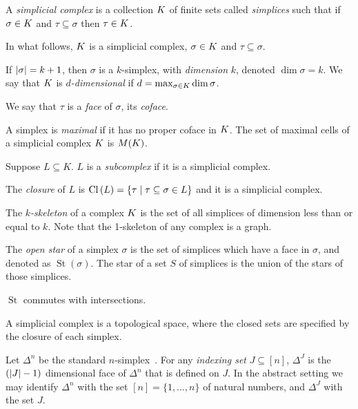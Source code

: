 \begin{definition}
A \emph{simplicial complex} is a collection $K$ of finite sets called
\emph{simplices} such that if $\sigma \in K$ and $\tau \subseteq \sigma$ then $\tau \in K$. 
\end{definition}
In what follows, $K$ is a simplicial complex, $\sigma \in K$ and $\tau \subseteq \sigma$.
\begin{definition}[Dimension]
If $|\sigma| = k+1$, then $\sigma$ is a $k$-simplex, with \emph{dimension} $k$, denoted 
$\dim{\sigma} = k$. We say that $K$ is \emph{$d$-dimensional} if 
$d = \max_{\sigma \in K} \dim{\sigma}$.
\end{definition}
\begin{definition}
We say that $\tau$ is a \emph{face} of $\sigma$, its \emph{coface}. 
\end{definition}
\begin{definition}
A simplex is \emph{maximal} if it has no proper coface in $K$. The set of maximal cells of a simplicial complex $K$ is $M(K)$. 
\end{definition}
\begin{definition}[Subcomplexes]
Suppose $L \subseteq K$.  $L$ is a \emph{subcomplex} if it is a simplicial complex.
\end{definition}
\begin{definition}[Closure]
 The \emph{closure} of $L$ is $\operatorname{Cl}{(}L) = \{ \tau \mid \tau \subseteq \sigma \in L\}$ and it is a simplicial complex.
\end{definition}
\begin{definition}
The  \emph{$k$-skeleton} of a complex $K$ is the set of all simplices
of dimension less than or equal to $k$. Note that the 1-skeleton of
any complex is a graph.
\end{definition}
\begin{definition}
The \emph{open star} of a simplex $\sigma$ is the set of simplices which have a face in $\sigma$, and denoted as $\operatorname{St}(\sigma)$. The star of a set $S$ of simplices is the union of the stars of those simplices.
\end{definition}
\begin{lemma}
$\operatorname{St}$ commutes with intersections.
\label{lem:st-inter}
\end{lemma}
A simplicial complex is a topological space, where the closed sets are specified by the closure of each simplex.
\begin{definition}
Let $\Delta^n$ be the standard $n$-simplex~\cite{hatcher}. For any
\emph{indexing set} $J \subseteq [n]$, $\Delta^J$ is the $(|J|-1)$ 
dimensional face of $\Delta^n$  that is defined on $J$. In the abstract setting we may
identify $\Delta^n$ with the set $[n] = \{1, \ldots, n\}$ of natural numbers, and $\Delta^J$ with the set $J$.
\end{definition}
